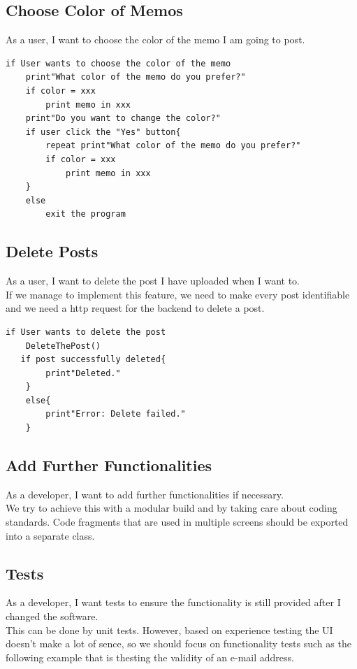 \documentclass[conference]{IEEEtran}
\numberwithin{figure}{subsection}
\begin{document}
\subsection{Choose Color of Memos}
As a user, I want to choose the color of the memo I am going to post.\\
\begin{lstlisting}
if User wants to choose the color of the memo
	print"What color of the memo do you prefer?"
	if color = xxx
		print memo in xxx
    print"Do you want to change the color?"
    if user click the "Yes" button{
    	repeat print"What color of the memo do you prefer?"
   		if color = xxx
    		print memo in xxx
    }
    else 
    	exit the program
\end{lstlisting}

\subsection{Delete Posts}
As a user, I want to delete the post I have uploaded when I want to. \\

If we manage to implement this feature, we need to make every post identifiable and we need a http request for the backend to delete a post.
\begin{lstlisting}
if User wants to delete the post
	DeleteThePost()
   if post successfully deleted{
		print"Deleted."
	}
	else{
		print"Error: Delete failed."
	}
\end{lstlisting}

\subsection{Add Further Functionalities}
As a developer, I want to add further functionalities if necessary.\\

We try to achieve this with a modular build and by taking care about coding standards. Code fragments that are used in multiple screens should be exported into a separate class.

\subsection{Tests}
As a developer, I want tests to ensure the functionality is still provided after I changed the software.\\

This can be done by unit tests. However, based on experience testing the UI doesn't make a lot of sence, so we should focus on functionality tests such as the following example that is thesting the validity of an e-mail address.
\end{document}
